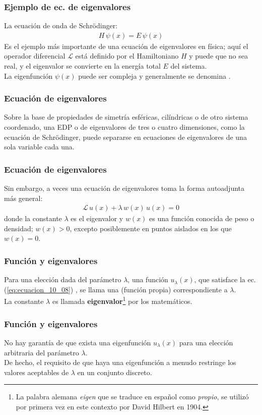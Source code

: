\documentclass[12pt]{beamer}
\begin{document}
\begin{frame}
\frametitle{Ejemplo de ec. de eigenvalores}
La ecuación de onda de Schrödinger:
\pause
\begin{align*}
H \, \psi (x) = E \, \psi (x)
\end{align*}
\fontsize{12}{12}\selectfont
Es el ejemplo más importante de una ecuación de eigenvalores en física; aquí el operador diferencial $\mathcal{L}$ está definido por el Hamiltoniano $H$ y puede que no sea real, y el eigenvalor se convierte en la energía total $E$ del sistema.
\\
\bigskip
\pause
La eigenfunción $\psi (x)$ puede ser compleja y generalmente se denomina .
\end{frame}
\begin{frame}
\frametitle{Ecuación de eigenvalores}
Sobre la base de propiedades de simetría esféricas, cilíndricas o de otro sistema coordenado, una EDP o de eigenvalores de tres o cuatro dimensiones, como la ecuación de Schrödinger, puede separarse en ecuaciones de eigenvalores de una sola variable cada una.
\end{frame}
\begin{frame}
\frametitle{Ecuación de eigenvalores}
Sin embargo, a veces una ecuación de eigenvalores toma la forma autoadjunta más general:
\pause
\begin{align}
\mathcal{L} \, u (x) + \lambda \, w (x) \, u (x) = 0
\label{eq:ecuacion_10_08}
\end{align}
donde la constante $\lambda$ es el eigenvalor y $w (x)$ es una función conocida de peso o densidad; $w (x) > 0$, excepto posiblemente en puntos aislados en los que $w (x) = 0$.
\end{frame}
\begin{frame}
\frametitle{Función y eigenvalores}
Para una elección dada del parámetro $\lambda$, una función $u_{\lambda}(x)$, que satisface la ec. (\ref{eq:ecuacion_10_08}) , se llama una  (función propia) correspondiente a $\lambda$.
\\
\bigskip
\pause
La constante $\lambda$ es llamada \textbf{eigenvalor}\footnote{La palabra alemana \emph{eigen} que se traduce en español como \emph{propio}, se utilizó por primera vez en este contexto por David Hilbert en 1904.} por los matemáticos.
\end{frame}
\begin{frame}
\frametitle{Función y eigenvalores}
No hay garantía de que exista una eigenfunción $u_{\lambda} (x)$ para una elección arbitraria del parámetro $\lambda$.
\\
\bigskip
\pause
De hecho, el requisito de que haya una eigenfunción a menudo restringe los valores aceptables de $\lambda$ en un conjunto discreto. 
\end{frame}
\end{document}
